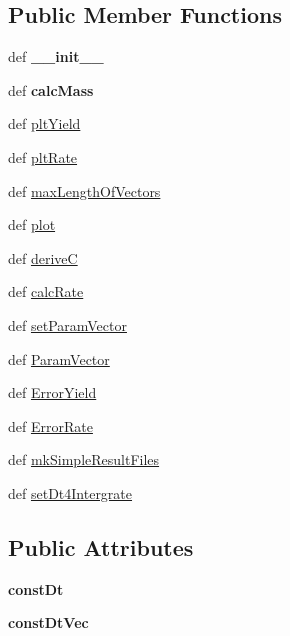 \subsection*{\-Public \-Member \-Functions}
\begin{DoxyCompactItemize}
\item 
\hypertarget{classModels_1_1ConstantRateModel_a1dbc868c3fea6eb4e2de48c26ca28d21}{def {\bfseries \-\_\-\-\_\-init\-\_\-\-\_\-}}\label{classModels_1_1ConstantRateModel_a1dbc868c3fea6eb4e2de48c26ca28d21}

\item 
\hypertarget{classModels_1_1ConstantRateModel_adda655b4249b8e737d08c51c962165f1}{def {\bfseries calc\-Mass}}\label{classModels_1_1ConstantRateModel_adda655b4249b8e737d08c51c962165f1}

\item 
def \hyperlink{classModels_1_1Model_a317ed848b969dbe3a96dd05e8b771900}{plt\-Yield}
\item 
def \hyperlink{classModels_1_1Model_aa35c741babf8f141df48c4021e0664e4}{plt\-Rate}
\item 
def \hyperlink{classModels_1_1Model_a3396d6ca1a7b7d66e55ada8c3c7a509e}{max\-Length\-Of\-Vectors}
\item 
def \hyperlink{classModels_1_1Model_ae404a691e48bfe4eafcdfdd09f1dae48}{plot}
\item 
def \hyperlink{classModels_1_1Model_a010945ed2adff59a7a5fce36025e7a97}{derive\-C}
\item 
def \hyperlink{classModels_1_1Model_a7c9280e33f9e0d46703cebc131008c65}{calc\-Rate}
\item 
def \hyperlink{classModels_1_1Model_a818f207e2a4bd0e9a3720ca611960e5a}{set\-Param\-Vector}
\item 
def \hyperlink{classModels_1_1Model_a13c76a0fe24d43cdc4d21fbc73fa96fa}{\-Param\-Vector}
\item 
def \hyperlink{classModels_1_1Model_ad3e627980d9e781bf7b2c9ff900ca06b}{\-Error\-Yield}
\item 
def \hyperlink{classModels_1_1Model_a3050eb39341f318d8d88b172f88bd240}{\-Error\-Rate}
\item 
def \hyperlink{classModels_1_1Model_adcb987bccae63a742490ea1e6d5f7a74}{mk\-Simple\-Result\-Files}
\item 
def \hyperlink{classModels_1_1Model_ac28252ae5cd6b5ecd4c5d006a0e6567d}{set\-Dt4\-Intergrate}
\end{DoxyCompactItemize}
\subsection*{\-Public \-Attributes}
\begin{DoxyCompactItemize}
\item 
\hypertarget{classModels_1_1ConstantRateModel_ac6e5d7c5f8ee942649b6a532d5bb45b7}{{\bfseries const\-Dt}}\label{classModels_1_1ConstantRateModel_ac6e5d7c5f8ee942649b6a532d5bb45b7}

\item 
\hypertarget{classModels_1_1Model_a3f71983de5f8b86bec47929213b900ec}{{\bfseries const\-Dt\-Vec}}\label{classModels_1_1Model_a3f71983de5f8b86bec47929213b900ec}

\end{DoxyCompactItemize}



